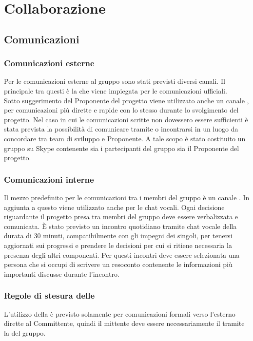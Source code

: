 \section{Collaborazione}

\subsection{Comunicazioni}

\subsubsection{Comunicazioni esterne}
Per le comunicazioni esterne al gruppo sono stati previsti diversi canali.
Il principale tra questi è la \email{} \href{mailto:\GroupEmail}{\GroupEmail}{} che viene impiegata per le comunicazioni ufficiali.\\
Sotto suggerimento del Proponente del progetto viene utilizzato anche un canale , per comunicazioni più dirette e rapide con lo stesso durante lo svolgimento del progetto. Nel caso in cui le comunicazioni scritte non dovessero essere sufficienti è stata prevista la possibilità di comunicare tramite  o incontrarsi in un luogo da concordare tra team di sviluppo e Proponente. A tale scopo è stato costituito un gruppo su Skype contenente sia i partecipanti del gruppo sia il Proponente del progetto.

\subsubsection{Comunicazioni interne} \label{sec:comunicazioni_interne}
Il mezzo predefinito per le comunicazioni tra i membri del gruppo è un canale .
In aggiunta a questo viene utilizzato anche  per le chat vocali.
Ogni decisione riguardante il progetto presa tra membri del gruppo deve essere verbalizzata e comunicata.
\`{E} stato previsto un incontro quotidiano tramite chat vocale della durata di 30 minuti, compatibilmente con gli impegni dei singoli, per tenersi aggiornati sui progressi e prendere le decisioni per cui si ritiene necessaria la presenza degli altri componenti. Per questi incontri deve essere selezionata una persona che si occupi di scrivere un resoconto contenente le informazioni più importanti discusse durante l'incontro.

\subsubsection{Regole di stesura delle \email}
L'utilizzo della \email{} è previsto solamente per comunicazioni formali verso l'esterno dirette al Committente, quindi il mittente deve essere necessariamente il \Responsabile{} tramite la \email{} del gruppo.

